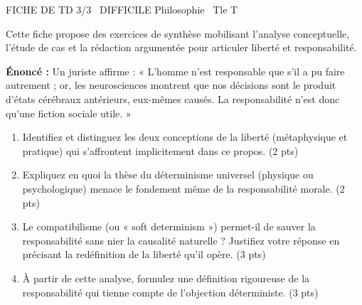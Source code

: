 \documentclass[11pt]{article}
\begin{document}
\begin{tcolorbox}[enhanced,colback=popink,colframe=popink,arc=10pt,boxrule=0pt,left=12pt,right=12pt,top=9pt,bottom=9pt]
{\color{white}\popxbold\small FICHE DE TD 3/3 \textbullet\ DIFFICILE \hfill Philosophie \textbullet\ Tle T\par}
\end{tcolorbox}
\vspace{4pt}
Cette fiche propose des exercices de synthèse mobilisant l'analyse conceptuelle, l'étude de cas et la rédaction argumentée pour articuler liberté et responsabilité.

\begin{exercice}
\textbf{Énoncé :} Un juriste affirme : « L'homme n'est responsable que s'il a pu faire autrement ; or, les neurosciences montrent que nos décisions sont le produit d'états cérébraux antérieurs, eux-mêmes causés. La responsabilité n'est donc qu'une fiction sociale utile. »
\begin{enumerate}
    \item Identifiez et distinguez les deux conceptions de la liberté (métaphysique et pratique) qui s'affrontent implicitement dans ce propos. (2 pts)
    \item Expliquez en quoi la thèse du déterminisme universel (physique ou psychologique) menace le fondement même de la responsabilité morale. (2 pts)
    \item Le compatibilisme (ou « soft determinism ») permet-il de sauver la responsabilité sans nier la causalité naturelle ? Justifiez votre réponse en précisant la redéfinition de la liberté qu'il opère. (3 pts)
    \item À partir de cette analyse, formulez une définition rigoureuse de la responsabilité qui tienne compte de l'objection déterministe. (3 pts)
\end{enumerate}
\end{exercice}
\end{document}
